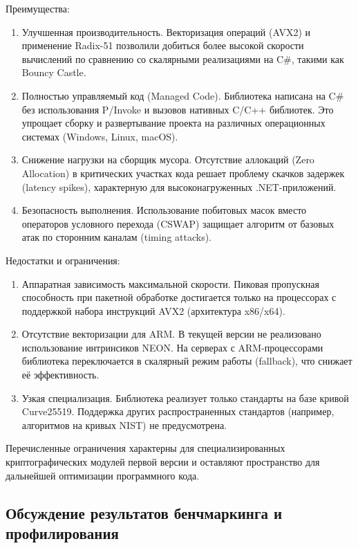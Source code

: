 Преимущества:
\begin{enumerate}
    \item Улучшенная производительность. Векторизация операций (AVX2) и применение Radix-51 позволили добиться более высокой скорости вычислений по сравнению со скалярными реализациями на C\#, такими как Bouncy Castle.
    \item Полностью управляемый код (Managed Code). Библиотека написана на C\# без использования P/Invoke и вызовов нативных C/C++ библиотек. Это упрощает сборку и развертывание проекта на различных операционных системах (Windows, Linux, macOS).
    \item Снижение нагрузки на сборщик мусора. Отсутствие аллокаций (Zero Allocation) в критических участках кода решает проблему скачков задержек (latency spikes), характерную для высоконагруженных .NET-приложений.
    \item Безопасность выполнения. Использование побитовых масок вместо операторов условного перехода (CSWAP) защищает алгоритм от базовых атак по сторонним каналам (timing attacks).
\end{enumerate}

Недостатки и ограничения:
\begin{enumerate}
    \item Аппаратная зависимость максимальной скорости. Пиковая пропускная способность при пакетной обработке достигается только на процессорах с поддержкой набора инструкций AVX2 (архитектура x86/x64). 
    \item Отсутствие векторизации для ARM. В текущей версии не реализовано использование интринсиков NEON. На серверах с ARM-процессорами библиотека переключается в скалярный режим работы (fallback), что снижает её эффективность.
    \item Узкая специализация. Библиотека реализует только стандарты на базе кривой Curve25519. Поддержка других распространенных стандартов (например, алгоритмов на кривых NIST) не предусмотрена.
\end{enumerate}

Перечисленные ограничения характерны для специализированных криптографических модулей первой версии и оставляют пространство для дальнейшей оптимизации программного кода.

\subsection{Обсуждение результатов бенчмаркинга и профилирования}


